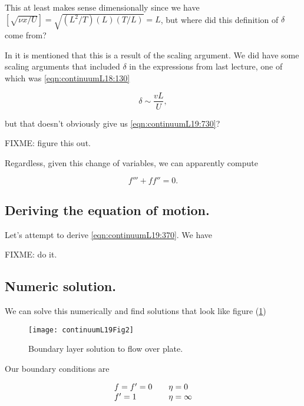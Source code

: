 This at least makes sense dimensionally since we have $[\sqrt{\nu x/U}] = \sqrt{ (L^2/T) (L) (T/L)} = L$, but where did this definition of $\delta$ come from?

In \cite{ wiki:BlasiusBoundary} it is mentioned that this is a result of the scaling argument.  We did have some scaling arguments that included $\delta$ in the expressions from last lecture, one of which was \ref{eqn:continuumL18:130}

\begin{equation}\label{eqn:continuumL19:750}
\delta \sim \frac{v L}{U},
\end{equation}

but that doesn't obviously give us \ref{eqn:continuumL19:730}?

FIXME: figure this out.

Regardless, given this change of variables, we can apparently compute

\begin{equation}\label{eqn:continuumL19:370}
f''' + f f'' = 0.
\end{equation}

\subsection{Deriving the equation of motion.}

Let's attempt to derive \ref{eqn:continuumL19:370}.  We have

FIXME: do it.

\subsection{Numeric solution.}
We can solve this numerically and find solutions that look like figure (\ref{fig:continuumL19:continuumL19Fig2})
\begin{figure}[htp]
   \centering
   \texttt{[image: continuumL19Fig2]}
   \caption{Boundary layer solution to flow over plate.}\label{fig:continuumL19:continuumL19Fig2}
\end{figure}

Our boundary conditions are

\begin{equation}\label{eqn:continuumL19:390}
\begin{array}{l l}
f = f' = 0 & \quad \mbox{$\eta = 0$} \\
f' = 1 & \quad \mbox{$\eta = \infty$} \\
\end{array}
\end{equation}


